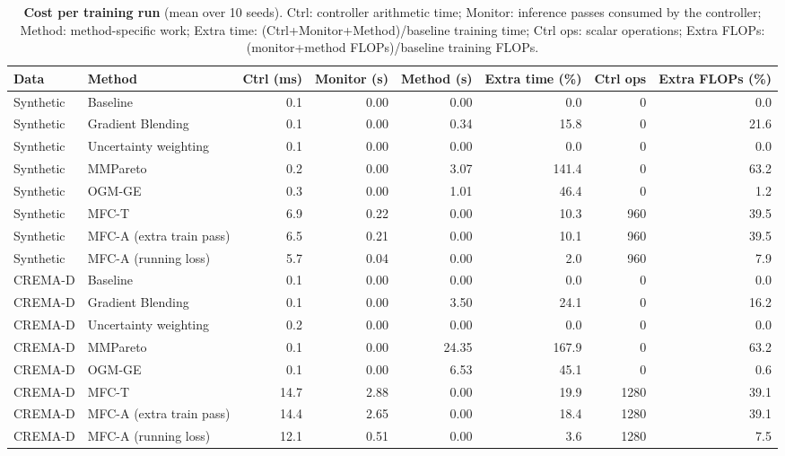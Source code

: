 \documentclass[fleqn,10pt]{wlscirep}
\providecommand{\DIFaddbegin}{} %
\providecommand{\DIFaddend}{} %
\providecommand{\DIFdelend}{} %
\begin{document}
\DIFdelend \DIFaddbegin \begin{table}[t]
\caption{\textbf{Cost per training run} (mean over 10 seeds). Ctrl: controller arithmetic time; Monitor: inference passes consumed by the controller; Method: method-specific work; Extra time: (Ctrl+Monitor+Method)/baseline training time; Ctrl ops: scalar operations; Extra FLOPs: (monitor+method FLOPs)/baseline training FLOPs.}
\label{tab:cost}
\centering
\footnotesize
\begin{tabular}{@{}llrrrrrr@{}}
\toprule
\textbf{Data} & \textbf{Method} & \textbf{Ctrl (ms)} & \textbf{Monitor (s)} & \textbf{Method (s)} & \textbf{Extra time (\%)} & \textbf{Ctrl ops} & \textbf{Extra FLOPs (\%)} \\ \midrule
Synthetic & Baseline & 0.1 & 0.00 & 0.00 & 0.0 & 0 & 0.0 \\
Synthetic & Gradient Blending & 0.1 & 0.00 & 0.34 & 15.8 & 0 & 21.6 \\
Synthetic & Uncertainty weighting & 0.1 & 0.00 & 0.00 & 0.0 & 0 & 0.0 \\
Synthetic & MMPareto & 0.2 & 0.00 & 3.07 & 141.4 & 0 & 63.2 \\
Synthetic & OGM-GE & 0.3 & 0.00 & 1.01 & 46.4 & 0 & 1.2 \\
Synthetic & MFC-T & 6.9 & 0.22 & 0.00 & 10.3 & 960 & 39.5 \\
Synthetic & MFC-A (extra train pass) & 6.5 & 0.21 & 0.00 & 10.1 & 960 & 39.5 \\
Synthetic & MFC-A (running loss) & 5.7 & 0.04 & 0.00 & 2.0 & 960 & 7.9 \\
CREMA-D & Baseline & 0.1 & 0.00 & 0.00 & 0.0 & 0 & 0.0 \\
CREMA-D & Gradient Blending & 0.1 & 0.00 & 3.50 & 24.1 & 0 & 16.2 \\
CREMA-D & Uncertainty weighting & 0.2 & 0.00 & 0.00 & 0.0 & 0 & 0.0 \\
CREMA-D & MMPareto & 0.1 & 0.00 & 24.35 & 167.9 & 0 & 63.2 \\
CREMA-D & OGM-GE & 0.1 & 0.00 & 6.53 & 45.1 & 0 & 0.6 \\
CREMA-D & MFC-T & 14.7 & 2.88 & 0.00 & 19.9 & 1280 & 39.1 \\
CREMA-D & MFC-A (extra train pass) & 14.4 & 2.65 & 0.00 & 18.4 & 1280 & 39.1 \\
CREMA-D & MFC-A (running loss) & 12.1 & 0.51 & 0.00 & 3.6 & 1280 & 7.5 \\
\bottomrule
\end{tabular}
\end{table}
\DIFaddend 
\end{document}
